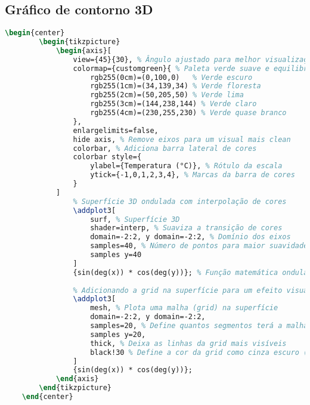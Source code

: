 \subsection{Gráfico de contorno 3D}

\begin{lstlisting}[language=tex, caption=Gráfico de contorno 3D]
    \begin{center}
        \begin{tikzpicture}
            \begin{axis}[
                view={45}{30}, % Ângulo ajustado para melhor visualização
                colormap={customgreen}{ % Paleta verde suave e equilibrada
                    rgb255(0cm)=(0,100,0)   % Verde escuro
                    rgb255(1cm)=(34,139,34) % Verde floresta
                    rgb255(2cm)=(50,205,50) % Verde lima
                    rgb255(3cm)=(144,238,144) % Verde claro
                    rgb255(4cm)=(230,255,230) % Verde quase branco
                },
                enlargelimits=false,
                hide axis, % Remove eixos para um visual mais clean
                colorbar, % Adiciona barra lateral de cores
                colorbar style={
                    ylabel={Temperatura (°C)}, % Rótulo da escala
                    ytick={-1,0,1,2,3,4}, % Marcas da barra de cores
                }
            ]
                % Superfície 3D ondulada com interpolação de cores
                \addplot3[
                    surf, % Superfície 3D
                    shader=interp, % Suaviza a transição de cores
                    domain=-2:2, y domain=-2:2, % Domínio dos eixos
                    samples=40, % Número de pontos para maior suavidade
                    samples y=40
                ]
                {sin(deg(x)) * cos(deg(y))}; % Função matemática ondulada
    
                % Adicionando a grid na superfície para um efeito visual aprimorado
                \addplot3[
                    mesh, % Plota uma malha (grid) na superfície
                    domain=-2:2, y domain=-2:2, 
                    samples=20, % Define quantos segmentos terá a malha
                    samples y=20,
                    thick, % Deixa as linhas da grid mais visíveis
                    black!30 % Define a cor da grid como cinza escuro (30% preto)
                ]
                {sin(deg(x)) * cos(deg(y))};
            \end{axis}
        \end{tikzpicture}
    \end{center}
\end{lstlisting} 

